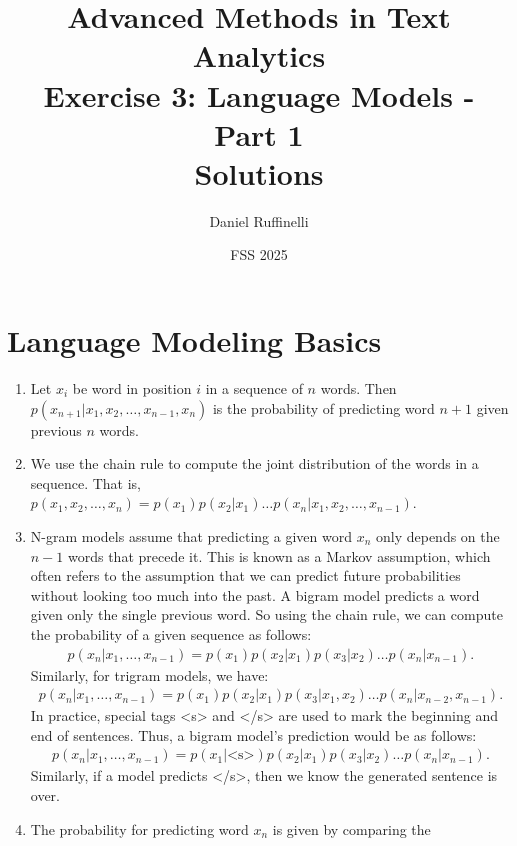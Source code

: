 \documentclass[11pt,a4paper]{article}
\title{Advanced Methods in Text Analytics \\ 
Exercise 3: Language Models - Part 1 \\
\textbf{Solutions}}
\author{Daniel Ruffinelli}
\date{FSS 2025}
\begin{document}
\maketitle

\section{Language Modeling Basics}

\begin{enumerate}[label=(\alph*)]
    \item Let $x_i$ be word in position $i$ in a sequence of $n$ words. Then
          $p(x_{n+1}|x_1, x_2, \ldots, x_{n-1}, x_{n})$ is the probability of
          predicting word $n+1$ given previous $n$ words.
    \item We use the chain rule to compute the joint distribution of the words
          in a sequence.
          That is,
          $p(x_1, x_2, \ldots, x_n) = p(x_1)p(x_2|x_1)\ldots p(x_n|x_1,x_2,\ldots,x_{n-1})$.
    \item N-gram models assume that predicting a given word $x_n$ only depends
          on the $n-1$ words that precede it.
          This is known as a Markov assumption, which often refers to the
          assumption that we can predict future probabilities without looking
          too much into the past.
          A bigram model predicts a word given only the single previous word.
          So using the chain rule, we can compute the probability of a given
          sequence as follows:
          \begin{align*}
              p(x_n|x_1,\ldots,x_{n-1}) = p(x_1)p(x_2|x_1)p(x_3|x_2)\ldots p(x_n|x_{n-1}).
          \end{align*}
          Similarly, for trigram models, we have:
          \begin{align*}
              p(x_n|x_1,\ldots,x_{n-1}) = p(x_1)p(x_2|x_1)p(x_3|x_1,x_2)\ldots p(x_n|x_{n-2},x_{n-1}).
          \end{align*}
          In practice, special tags <s> and </s> are used to mark the beginning
          and end of sentences.
          Thus, a bigram model's prediction would be as follows:
          \begin{align*}
              p(x_n|x_1,\ldots,x_{n-1}) = p(x_1|\text{<s>})p(x_2|x_1)p(x_3|x_2)\ldots p(x_n|x_{n-1}).
          \end{align*}
          Similarly, if a model predicts </s>, then we know the generated
          sentence is over.
    \item The probability for predicting word $x_n$ is given by comparing the

\end{enumerate}
\end{document}
